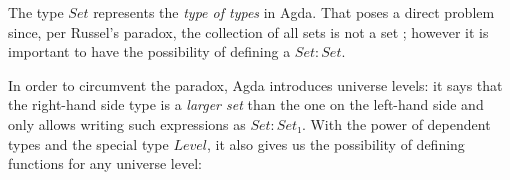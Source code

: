 {The type $Set$ represents the \emph{type of types} in Agda. That poses a direct problem since, per Russel's paradox, the collection of all sets is not a set \cite{2019Official2.5.4.2}; however it is important to have the possibility of defining a $Set : Set$.

In order to circumvent the paradox, Agda introduces universe levels: it says that the right-hand side type is a \emph{larger set} than the one on the left-hand side and only allows writing such expressions as $Set : Set₁$. With the power of dependent types and the special type $Level$, it also gives us the possibility of defining functions for any universe level:

\begin{code}%
\>[0]\AgdaSpace{}%
\AgdaSpace{}%
\<%
\\
%
\\[\AgdaEmptyExtraSkip]%
\>[0]\AgdaSpace{}%
\AgdaSpace{}%
\AgdaSymbol{\{}\AgdaSpace{}%
\AgdaSymbol{:}\AgdaSpace{}%
\AgdaSymbol{\}}\AgdaSpace{}%
\AgdaSymbol{(}\AgdaSpace{}%
\AgdaSymbol{:}\AgdaSpace{}%
\AgdaSpace{}%
\AgdaSymbol{)}\AgdaSpace{}%
\AgdaSymbol{:}\AgdaSpace{}%
\AgdaSpace{}%
\AgdaSpace{}%
\<%
\\
\>[0][@{}l@{\AgdaIndent{0}}]%
\>[2]\AgdaInductiveConstructor{[]}%
\>[7]\AgdaSymbol{:}\AgdaSpace{}%
\AgdaSpace{}%
\<%
\\
%
\>[2]\AgdaOperator{\AgdaInductiveConstructor{\AgdaUnderscore{}::\AgdaUnderscore{}}}\AgdaSpace{}%
\AgdaSymbol{:}\AgdaSpace{}%
\AgdaSpace{}%
\AgdaSpace{}%
\AgdaSpace{}%
\AgdaSpace{}%
\AgdaSpace{}%
\AgdaSpace{}%
\<%
\end{code}}

